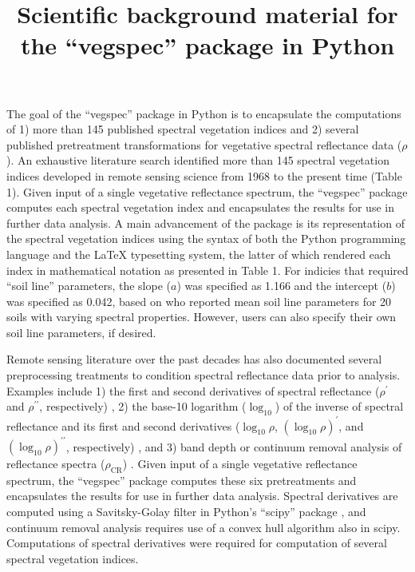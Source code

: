 \documentclass[10pt]{article}
\begin{document}
\title{Scientific background material for the ``vegspec'' package in Python}

\maketitle

The goal of the ``vegspec'' package in Python is to encapsulate the computations of 1) more than 145 published spectral vegetation indices and 2) several published pretreatment transformations for vegetative spectral reflectance data ($\rho$). An exhaustive literature search identified more than 145 spectral vegetation indices developed in remote sensing science from 1968 to the present time (Table 1). Given input of a single vegetative reflectance spectrum, the ``vegspec'' package computes each spectral vegetation index and encapsulates the results for use in further data analysis. A main advancement of the package is its representation of the spectral vegetation indices using the syntax of both the Python programming language and the LaTeX typesetting system, the latter of which rendered each index in mathematical notation as presented in Table 1. For indicies that required ``soil line'' parameters, the slope ($a$) was specified as 1.166 and the intercept ($b$) was specified as 0.042, based on \citet{Huete1984} who reported mean soil line parameters for 20 soils with varying spectral properties. However, users can also specify their own soil line parameters, if desired.

Remote sensing literature over the past decades has also documented several preprocessing treatments to condition spectral reflectance data prior to analysis. Examples include 1) the first and second derivatives of spectral reflectance ($\rho^\prime$ and $\rho^{\prime\prime}$, respectively) \citep{Horler1983}, 2) the base-10 logarithm ($\log_{10}$) of the inverse of spectral reflectance and its first and second derivatives ($\log_{10} \rho$, $(\log_{10} \rho)^\prime$, and $(\log_{10} \rho)^{\prime\prime}$, respectively) \citep{Blackburn1998a,Yoder1995}, and 3) band depth or continuum removal analysis of reflectance spectra ($\rho_{\text{CR}}$) \citep{Curran2001,Huang2004,Kokaly1999}. Given input of a single vegetative reflectance spectrum, the ``vegspec'' package computes these six pretreatments and encapsulates the results for use in further data analysis. Spectral derivatives are computed using a Savitsky-Golay filter in Python’s ``scipy'' package \citep{Virtanen2020}, and continuum removal analysis requires use of a convex hull algorithm also in scipy. Computations of spectral derivatives were required for computation of several spectral vegetation indices.
\end{document}
